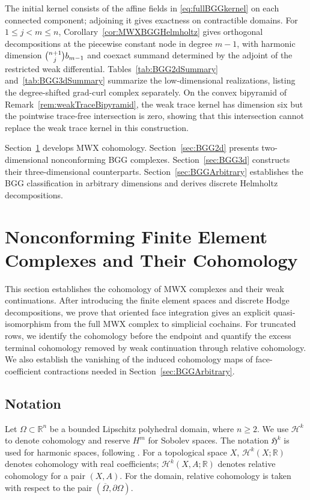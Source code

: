 \documentclass[10pt]{amsart}
\numberwithin{equation}{section}
\begin{document}
The initial kernel consists of the affine fields in
\eqref{eq:fullBGGkernel} on each connected component; adjoining it gives
exactness on contractible domains.
For $1\leq j<m\leq n$, Corollary~\ref{cor:MWXBGGHelmholtz} gives
orthogonal decompositions at the piecewise constant node in degree $m-1$,
with harmonic dimension $\tbinom{n+1}{j}b_{m-1}$ and coexact summand
determined by the adjoint of the restricted weak differential.
Tables~\ref{tab:BGG2dSummary} and~\ref{tab:BGG3dSummary} summarize the
low-dimensional realizations, listing the degree-shifted grad-curl
complex separately.
On the convex bipyramid of Remark~\ref{rem:weakTraceBipyramid}, the
weak trace kernel has dimension six but the pointwise trace-free
intersection is zero, showing that this intersection cannot replace the
weak trace kernel in this construction.

Section~\ref{sec:MWXComplexes} develops MWX cohomology.
Section~\ref{sec:BGG2d} presents two-dimensional nonconforming BGG complexes.
Section~\ref{sec:BGG3d} constructs their three-dimensional counterparts.
Section~\ref{sec:BGGArbitrary} establishes the BGG classification in arbitrary dimensions and derives discrete Helmholtz decompositions.


\section{Nonconforming Finite Element Complexes and Their Cohomology}\label{sec:MWXComplexes}

This section establishes the cohomology of MWX complexes and their weak
continuations. After introducing the finite element spaces and discrete
Hodge decompositions, we prove that oriented face integration gives an
explicit quasi-isomorphism from the full MWX complex to simplicial
cochains. For truncated rows, we identify the cohomology before the
endpoint and quantify the excess terminal cohomology removed by weak
continuation through relative cohomology. We also establish the vanishing
of the induced cohomology maps of face-coefficient contractions needed in
Section~\ref{sec:BGGArbitrary}.

\subsection{Notation}
Let $\Omega\subset \mathbb{R}^n$ be a bounded Lipschitz polyhedral domain, where $n\geq2$.
We use $\mathscr H^k$ to denote cohomology and reserve $H^m$ for Sobolev
spaces. The notation $\mathfrak H^k$ is used for harmonic spaces,
following \cite[Section~2]{ArnoldHu2021}.
For a topological space $X$, $\mathscr H^k(X;\mathbb R)$ denotes cohomology
with real coefficients; $\mathscr H^k(X,A;\mathbb R)$ denotes relative
cohomology for a pair $(X,A)$.
For the domain, relative cohomology is taken with respect to the pair
$(\overline\Omega,\partial\Omega)$.
\end{document}
